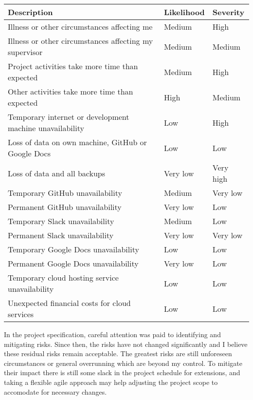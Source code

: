 \documentclass[12pt]{article}
\begin{document}
\begin{center}\begin{tabular}{ |l|l|l| }
  \hline
  \textbf{Description} & \textbf{Likelihood} & \textbf{Severity} \\
  \hline
  Illness or other circumstances affecting me & Medium & High \\
  \hline
  Illness or other circumstances affecting my supervisor & Medium & Medium \\
  \hline
  Project activities take more time than expected & Medium & High \\
  \hline
  Other activities take more time than expected & High & Medium \\
  \hline
  Temporary internet or development machine unavailability & Low & High \\
  \hline
  Loss of data on own machine, GitHub or Google Docs & Low & Low \\
  \hline
  Loss of data and all backups & Very low & Very high \\
  \hline
  Temporary GitHub unavailability & Medium & Very low \\
  \hline
  Permanent GitHub unavailability & Very low & Low \\
  \hline
  Temporary Slack unavailability & Medium & Low \\
  \hline
  Permanent Slack unavailability & Very low & Very low \\
  \hline
  Temporary Google Docs unavailability & Low & Low \\
  \hline
  Permanent Google Docs unavailability & Very low & Low \\
  \hline
  Temporary cloud hosting service unavailability & Low & Low \\
  \hline
  Unexpected financial costs for cloud services & Low & Low \\
  \hline
\end{tabular}\end{center}

In the project specification, careful attention was paid to identifying and mitigating risks. Since then, the risks have not changed significantly and I believe these residual risks remain acceptable. The greatest risks are still unforeseen circumstances or general overrunning which are beyond my control. To mitigate their impact there is still some slack in the project schedule for extensions, and taking a flexible agile approach may help adjusting the project scope to accomodate for necessary changes.
\end{document}
